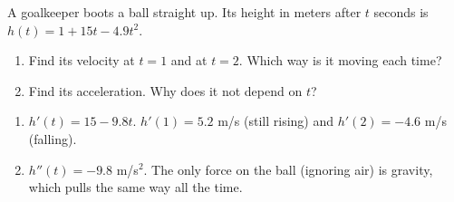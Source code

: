 \begin{Exercise}[title={Penalty Kick}, label=diffpoly_kick]
A goalkeeper boots a ball straight up. Its height in meters after $t$
seconds is $h(t) = 1 + 15t - 4.9t^2$.
\begin{enumerate}
\item Find its velocity at $t = 1$ and at $t = 2$. Which way is it moving
each time?
\item Find its acceleration. Why does it not depend on $t$?
\end{enumerate}
\end{Exercise}
\begin{Answer}[ref=diffpoly_kick]
\begin{enumerate}
\item $h'(t) = 15 - 9.8t$. $h'(1) = 5.2$ m/s (still rising) and $h'(2) =
-4.6$ m/s (falling).
\item $h''(t) = -9.8$ m/s$^2$. The only force on the ball (ignoring air)
is gravity, which pulls the same way all the time.
\end{enumerate}
\end{Answer}
